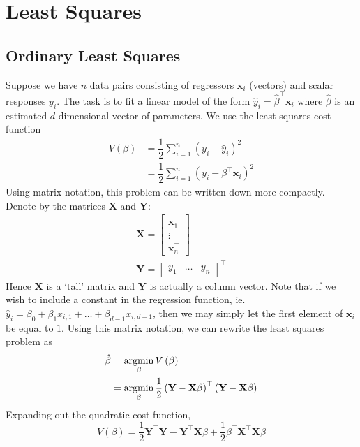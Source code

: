 \documentclass[11pt]{report} %
\begin{document}
\section{Least Squares}

\subsection{Ordinary Least Squares}

Suppose we have $n$ data pairs consisting of regressors $\mathbf{x}_{i}$ (vectors) and scalar responses $y_{i}$. The task is to fit a linear model of the form $\hat{y}_{i} = \hat{\beta}^{\top}\mathbf{x}_{i}$ where $\hat{\beta}$ is an estimated $d$-dimensional vector of parameters. We use the least squares cost function
\begin{align}
V\left(\beta\right) &= \dfrac{1}{2}\sum_{i = 1}^{n}\left(y_{i} - \hat{y}_{i}\right)^{2} \\
&= \dfrac{1}{2}\sum_{i = 1}^{n}\left(y_{i} - \beta^{\top}\mathbf{x}_{i}\right)^{2}
\end{align}
Using matrix notation, this problem can be written down more compactly. Denote by the matrices $\mathbf{X}$ and $\mathbf{Y}$:
\begin{gather}
\mathbf{X} = \begin{bmatrix}
\mathbf{x}_{1}^{\top} \\ \vdots \\ \mathbf{x}_{n}^{\top}
\end{bmatrix} \\
\mathbf{Y} = \begin{bmatrix} y_{1} & \dots & y_{n} \end{bmatrix}^{\top}
\end{gather}
Hence $\mathbf{X}$ is a `tall' matrix and $\mathbf{Y}$ is actually a column vector. Note that if we wish to include a constant in the regression function, ie. $\hat{y}_{i} = \beta_{0} + \beta_{1}x_{i,1} + \dots + \beta_{d - 1}x_{i, d - 1}$, then we may simply let the first element of $\mathbf{x}_{i}$ be equal to $1$. Using this matrix notation, we can rewrite the least squares problem as
\begin{align}
\hat{\beta} &= \operatorname*{argmin}_{\beta}V\left(\beta\right) \\
 &= \operatorname*{argmin}_{\beta}\dfrac{1}{2}\left(\mathbf{Y} - \mathbf{X}\beta\right)^{\top}\left(\mathbf{Y} - \mathbf{X}\beta\right)
\end{align}
Expanding out the quadratic cost function,
\begin{equation}
V\left(\beta\right) = \dfrac{1}{2}\mathbf{Y}^{\top}\mathbf{Y} - \mathbf{Y}^{\top}\mathbf{X}\beta + \dfrac{1}{2}\beta^{\top}\mathbf{X}^{\top}\mathbf{X}\beta
\end{equation}
\end{document}
